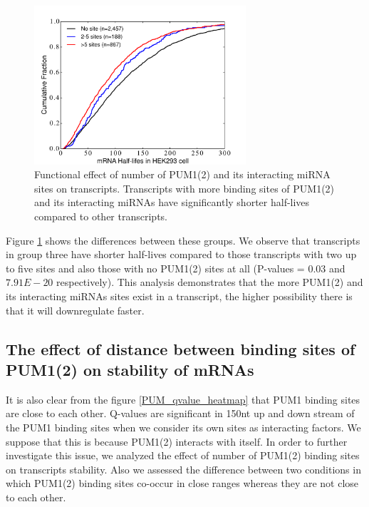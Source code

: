 \begin{figure}[H]
	\centering
	\includegraphics[width=0.7\textwidth,clip]{ch4_results_discussion/figures/pum_plus_intmiRNAs_number_of_sites}

\caption[Effect of binding sites of PUM1(2) and its interacting miRNAs count on expression of transcripts]{Functional effect of number of PUM1(2) and its interacting miRNA sites on transcripts. Transcripts with more binding sites of PUM1(2) and its interacting miRNAs have significantly shorter half-lives compared to other transcripts.}
\label{PUM_number_of_sites}
\end{figure}

Figure \ref{PUM_number_of_sites} shows the differences between these groups. We observe that transcripts in group three have shorter half-lives compared to those transcripts with two up to five sites and also those with no PUM1(2) sites at all (P-values = $0.03$ and $7.91E-20$ respectively). This analysis demonstrates that the more PUM1(2) and its interacting miRNAs sites exist in a transcript, the higher possibility there is that it will downregulate faster.

\subsection{The effect of distance between binding sites of PUM1(2) on stability of mRNAs}

It is also clear from the figure \ref{PUM_qvalue_heatmap} that PUM1 binding sites are close to each other. Q-values are significant in 150nt up and down stream of the PUM1 binding sites when we consider its own sites as interacting factors. We suppose that this is because PUM1(2) interacts with itself. In order to further investigate this issue, we analyzed the effect of number of PUM1(2) binding sites on transcripts stability. Also we assessed the difference between two conditions in which PUM1(2) binding sites co-occur in close ranges whereas they are not close to each other.


